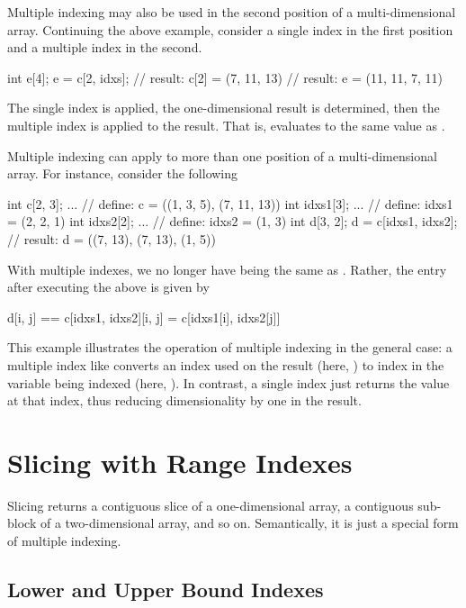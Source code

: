 Multiple indexing may also be used in the second position of a
multi-dimensional array.  Continuing the above example, consider a
single index in the first position and a multiple index in the second.
%
\begin{stancode}
int e[4];
e = c[2, idxs];  // result:  c[2] = (7, 11, 13)
                  // result:  e = (11, 11, 7, 11)
\end{stancode}
%
The single index is applied, the one-dimensional result is determined,
then the multiple index is applied to the result.  That is,
 evaluates to the same value as . 

Multiple indexing can apply to more than one position of a
multi-dimensional array.  For instance, consider the following
%
\begin{stancode}
int c[2, 3];   
...                    // define: c = ((1, 3, 5), (7, 11, 13))
int idxs1[3];
...                    // define: idxs1 = (2, 2, 1)
int idxs2[2]; 
...                    // define: idxs2 = (1, 3)
int d[3, 2];
d = c[idxs1, idxs2];  // result: d = ((7, 13), (7, 13), (1, 5))
\end{stancode}
%
With multiple indexes, we no longer have  being
the same as .  Rather, the entry 
after executing the above is given by
%
\begin{stancode}
d[i, j] == c[idxs1, idxs2][i, j] = c[idxs1[i], idxs2[j]]
\end{stancode}
%
This example illustrates the operation of multiple indexing in the
general case: a multiple index like  converts an index
 used on the result (here, ) to index
 in the variable being indexed (here, ).  In
contrast, a single index just returns the value at that index, thus
reducing dimensionality by one in the result.

\section{Slicing with Range Indexes}

Slicing returns a contiguous slice of a one-dimensional array, a
contiguous sub-block of a two-dimensional array, and so on.
Semantically, it is just a special form of multiple indexing.

\subsection{Lower and Upper Bound Indexes}

